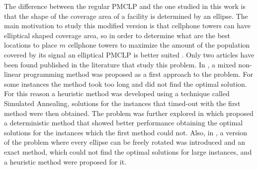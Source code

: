 The difference between the regular PMCLP and the one studied in this work is that the shape of the coverage area of a facility is determined by an ellipse. The main motivation to study this modified version is that cellphone towers can have elliptical shaped coverage area, so in order to determine what are the best locations to place $m$ cellphone towers to maximize the amount of the population covered by its signal an elliptical PMCLP is better suited \cite{canbolat}. Only two articles have been found published in the literature that study this problem. In \cite{canbolat}, a mixed non-linear programming method was proposed as a first approach to the problem. For some instances the method took too long and did not find the optimal solution. For this reason a heuristic method was developed using a technique called Simulated Annealing, solutions for the instances that timed-out with the first method were then obtained. The problem was further explored in \cite{andreta} which proposed a deterministic method that showed better performance obtaining the optimal solutions for the instances which the first method could not. Also, in \cite{andreta}, a version of the problem where every ellipse can be freely rotated was introduced and an exact method, which could not find the optimal solutions for large instances, and a heuristic method were proposed for it.